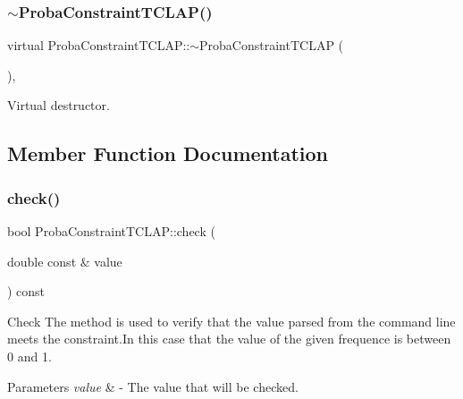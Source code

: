 \subsubsection{\texorpdfstring{$\sim$\+Proba\+Constraint\+T\+C\+L\+A\+P()}{~ProbaConstraintTCLAP()}}
{\footnotesize\ttfamily virtual Proba\+Constraint\+T\+C\+L\+A\+P\+::$\sim$\+Proba\+Constraint\+T\+C\+L\+AP (\begin{DoxyParamCaption}{ }\end{DoxyParamCaption})\hspace{0.3cm}{\ttfamily [inline]}, {\ttfamily [virtual]}}

Virtual destructor. 

\subsection{Member Function Documentation}
\hypertarget{class_proba_constraint_t_c_l_a_p_a803f58f2d4bc602791a3e88739ad1042}{}\label{class_proba_constraint_t_c_l_a_p_a803f58f2d4bc602791a3e88739ad1042} 
\subsubsection{\texorpdfstring{check()}{check()}}
{\footnotesize\ttfamily bool Proba\+Constraint\+T\+C\+L\+A\+P\+::check (\begin{DoxyParamCaption}\item[{double const \&}]{value }\end{DoxyParamCaption}) const\hspace{0.3cm}{\ttfamily [virtual]}}



Check The method is used to verify that the value parsed from the command line meets the constraint.\+In this case that the value of the given frequence is between 0 and 1. 


\begin{DoxyParams}{Parameters}
{\em value} & -\/ The value that will be checked. \\
\hline
\end{DoxyParams}
\hypertarget{class_proba_constraint_t_c_l_a_p_aeda0e4b7aef2a41083e941dc28b5f01a}{}\label{class_proba_constraint_t_c_l_a_p_aeda0e4b7aef2a41083e941dc28b5f01a} 
